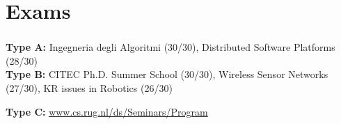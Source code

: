 \section{Exams}

\begin{frame}
	\frametitle{}
	
	\begin{center}
	\end{center}
	
	\vspace{-0.1cm}
	
	\tiny
	\textbf{Type A:} Ingegneria degli Algoritmi (30/30), Distributed Software Platforms (28/30) \\
	
	\vspace{0.1cm}
	\textbf{Type B:} CITEC Ph.D. Summer School (30/30), Wireless Sensor Networks (27/30), KR issues in Robotics
	(26/30)
	
	\vspace{-0.15cm}
	
	\textbf{Type C:} \url{www.cs.rug.nl/ds/Seminars/Program}
\end{frame}

